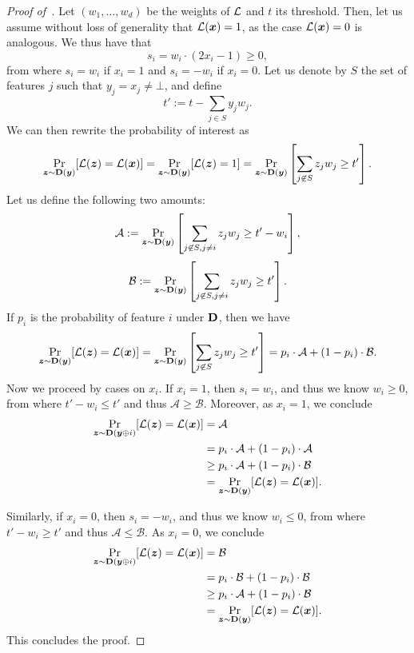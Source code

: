 \begin{proof}[Proof of~]
Let $(w_1, \ldots, w_d)$ be the weights of $\mathcal{L}$ and $t$ its threshold. Then, let us assume without loss of generality that $\mathcal{L}({\bm{x}}) = 1$, as the case $\mathcal{L}({\bm{x}}) = 0$ is analogous. 
We thus have that 
\[ 
    s_i = w_i \cdot (2x_i - 1) \geq 0,
\]
from where $s_i = w_i$ if $x_i = 1$ and $s_i = -w_i$ if $x_i = 0$.
Let us denote by $S$ the set of features $j$ such that $y_j = x_j \neq \bot$, and define 
\[ 
    t' := t - \sum_{j \in S} y_j w_j.
\]
We can then rewrite the probability of interest as
\[ 
    \Pr_{{\bm{z}} \sim \mathbf{D}({\bm{y}})}[\mathcal{L}({\bm{z}}) = \mathcal{L}({\bm{x}})] =   \Pr_{{\bm{z}} \sim \mathbf{D}({\bm{y}})}[\mathcal{L}({\bm{z}}) = 1] = \Pr_{{\bm{z}} \sim \mathbf{D}({\bm{y}})}\left[\sum_{j \not\in S} z_j w_j \geq t'\right].
\]
Let us define the following two amounts:
\[ 
    \mathcal{A} := \Pr_{{\bm{z}} \sim \mathbf{D}({\bm{y}})}\left[\sum_{j \not\in S, j \neq i} z_j w_j \geq t' - w_i\right],
\]
\[ 
    \mathcal{B} := \Pr_{{\bm{z}} \sim \mathbf{D}({\bm{y}})}\left[\sum_{j \not\in S, j \neq i} z_j w_j \geq t'\right].
\]
If $p_i$ is the probability of feature $i$ under $\mathbf{D}$, then we have 
\[ 
    \Pr_{{\bm{z}} \sim \mathbf{D}({\bm{y}})}[\mathcal{L}({\bm{z}}) = \mathcal{L}({\bm{x}})]  =  \Pr_{{\bm{z}} \sim \mathbf{D}({\bm{y}})}\left[\sum_{j \not\in S} z_j w_j \geq t'\right] = p_i \cdot \mathcal{A} + (1-p_i)\cdot \mathcal{B}.
\]
Now we proceed by cases on $x_i$. If $x_i = 1$, then $s_i = w_i$, and thus we know $w_i \geq 0$, from where $t' - w_i \leq t'$ and thus $\mathcal{A} \geq \mathcal{B}$. Moreover, as $x_i = 1$, we conclude 
\begin{align*}
    \Pr_{{\bm{z}} \sim \mathbf{D}({\bm{y}} \oplus i)}[\mathcal{L}({\bm{z}}) = \mathcal{L}({\bm{x}})] &= \mathcal{A}\\
     &= p_i \cdot \mathcal{A} + (1-p_i)\cdot \mathcal{A}\\
    &\geq p_i \cdot \mathcal{A} + (1-p_i)\cdot \mathcal{B}\\
    &= \Pr_{{\bm{z}} \sim \mathbf{D}({\bm{y}})}[\mathcal{L}({\bm{z}}) = \mathcal{L}({\bm{x}})].
\end{align*}

Similarly, if $x_i = 0$, then $s_i = -w_i$, and thus we know $w_i \leq 0$, from where $t' - w_i \geq t'$ and thus $\mathcal{A} \leq \mathcal{B}$. As $x_i = 0$, we conclude 
\begin{align*}
    \Pr_{{\bm{z}} \sim \mathbf{D}({\bm{y}} \oplus i)}[\mathcal{L}({\bm{z}}) = \mathcal{L}({\bm{x}})] &= \mathcal{B}\\
     &= p_i \cdot \mathcal{B} + (1-p_i)\cdot \mathcal{B}\\
    &\geq p_i \cdot \mathcal{A} + (1-p_i)\cdot \mathcal{B}\\
    &= \Pr_{{\bm{z}} \sim \mathbf{D}({\bm{y}})}[\mathcal{L}({\bm{z}}) = \mathcal{L}({\bm{x}})].
\end{align*}
This concludes the proof.
\end{proof}

